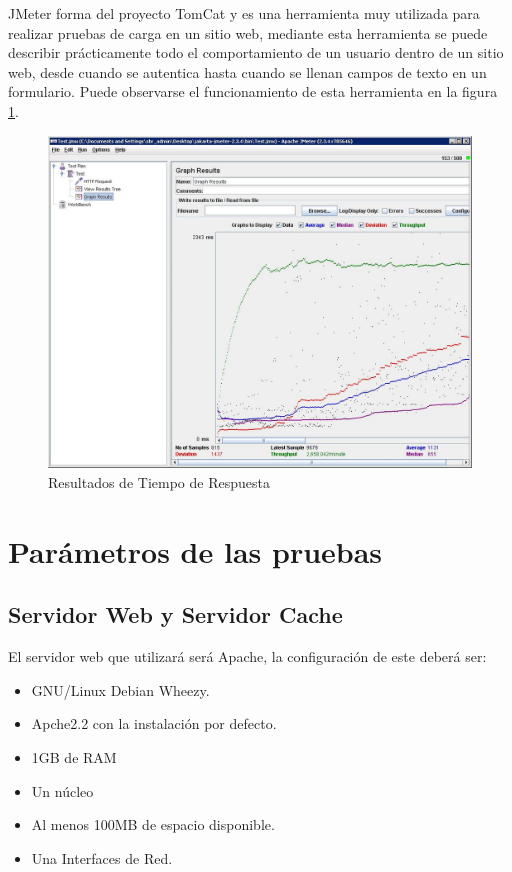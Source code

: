 JMeter forma del proyecto TomCat y es una herramienta muy utilizada para realizar pruebas de carga en un sitio web, mediante esta herramienta se puede describir prácticamente todo el comportamiento de un usuario dentro de un sitio web, desde cuando se autentica hasta cuando se llenan campos de texto en un formulario. Puede observarse el funcionamiento de esta herramienta en la figura \ref{jmeter}.

\begin{figure}[h]
  \centering
    \includegraphics[scale=0.4]{gfx/jmeter}
  \caption{Resultados de Tiempo de Respuesta}
  \label{jmeter}
\end{figure}




\section{Parámetros de las pruebas}

\subsection{Servidor Web y Servidor Cache}
El servidor web que utilizará será Apache, la configuración de este deberá ser:

\begin{itemize}
\item GNU/Linux Debian Wheezy.
\item Apche2.2 con la instalación por defecto.
\item 1GB de RAM 
\item Un núcleo
\item Al menos 100MB de espacio disponible.
\item Una Interfaces de Red.
\end{itemize}

